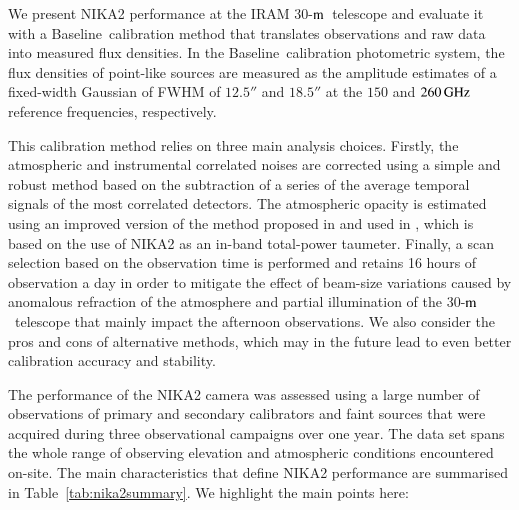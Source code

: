 \documentclass[traditionalabstract]{aa}
\newcommand{\trentemetre}{30-$\rm{m}$}
\newcommand{\baseline}{Baseline}%
\newcommand{\lp}[1]{#1}
\begin{document}
{\begin{table}[!thbp]
{  }
\end{table}

{\lp We present NIKA2 performance at the IRAM
  \trentemetre\ telescope and evaluate it with a
  \baseline\ calibration method that translates
  observations and raw data into measured flux densities.
  In the \baseline\ calibration photometric system, the flux
  densities of point-like sources are measured as the amplitude estimates
  of a fixed-width Gaussian of FWHM of $12.5''$ and $18.5''$ at the
$150$ and $260\,\rm{GHz}$ reference frequencies, respectively.

  This calibration method relies on three main analysis choices. Firstly, the
  atmospheric and instrumental correlated noises are corrected using a
  simple and robust method based on the subtraction of a series of
  the average temporal signals of the most correlated detectors. The
  atmospheric opacity is estimated using an improved version of 
  the method proposed in \citet{Catalano2014} and used in
  \citet{Adam2018}, which is based on the use of
  NIKA2 as an in-band total-power taumeter. Finally, a scan selection
  based on the observation time is performed and retains 16 hours
  of observation a day in order to mitigate the effect of beam-size
  variations caused by anomalous refraction of the atmosphere and
  partial illumination of the \trentemetre\ telescope that mainly
  impact the afternoon observations. We also consider the pros
  and cons of alternative methods, which may in the future lead to even
  better calibration accuracy and stability.}

The performance of the NIKA2 camera was assessed using a large
number of observations of primary and secondary calibrators and faint
 sources that were acquired during three
observational campaigns over one year. The data set spans the whole
range of observing
elevation and atmospheric conditions encountered on-site.
The main characteristics that define NIKA2 performance are
summarised in Table~\ref{tab:nika2summary}. We highlight the main
points here:

}
\end{document}
